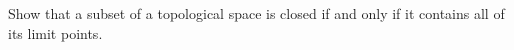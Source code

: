 \begin{exercise}
	Show that a subset of a topological space is closed if and only if it contains all of its limit points.
\end{exercise}
